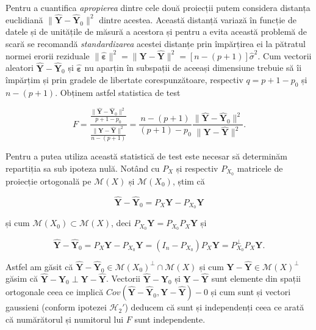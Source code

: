\documentclass[]{article}
\begin{document}
Pentru a cuantifica \emph{apropierea} dintre cele două proiecții putem
considera distanța euclidiană
\(\lVert\hat{\boldsymbol Y} - \hat{\boldsymbol Y}_0\rVert^2\) dintre
acestea. Această distanță variază în funcție de datele și de unitățile
de măsură a acestora și pentru a evita această problemă de scară se
recomandă \emph{standardizarea} acestei distanțe prin împărțirea ei la
pătratul normei erorii reziduale
\(\lVert\hat{\boldsymbol \varepsilon}\rVert^2 = \lVert\boldsymbol Y - \hat{\boldsymbol Y}\rVert^2 = [n - (p+1)]\hat{\sigma}^2\).
Cum vectorii aleatori \(\hat{\boldsymbol Y} - \hat{\boldsymbol Y}_0\) și
\(\hat{\boldsymbol \varepsilon}\) nu aparțin în subspații de aceeași
dimensiune trebuie să îi împărțim și prin gradele de libertate
corespunzătoare, respectiv \(q = p+1 - p_0\) și \(n - (p+1)\). Obținem
astfel statistica de test

\[
  F = \frac{\frac{\lVert\hat{\boldsymbol Y} - \hat{\boldsymbol Y}_0\rVert^2}{p+1-p_0}}{\frac{\lVert\boldsymbol Y - \hat{\boldsymbol Y}\rVert^2}{n - (p+1)}} = \frac{n - (p+1)}{(p+1) - p_0}\frac{\lVert\hat{\boldsymbol Y} - \hat{\boldsymbol Y}_0\rVert^2}{\lVert\boldsymbol Y - \hat{\boldsymbol Y}\rVert^2}.
\]

Pentru a putea utiliza această statistică de test este necesar să
determinăm repartiția sa sub ipoteza nulă. Notând cu \(P_X\) și
respectiv \(P_{X_0}\) matricele de proiecție ortogonală pe
\(\mathcal{M}(X)\) și \(\mathcal{M}(X_0)\), știm că

\[
  \hat{\boldsymbol Y} - \hat{\boldsymbol Y}_0 = P_X\boldsymbol Y - P_{X_0}\boldsymbol Y
\]

și cum \(\mathcal{M}(X_0)\subset \mathcal{M}(X)\), deci
\(P_{X_0}\boldsymbol Y = P_{X_0}P_{X}\boldsymbol Y\) și

\[
  \hat{\boldsymbol Y} - \hat{\boldsymbol Y}_0 = P_{X}\boldsymbol Y -  P_{X_0}\boldsymbol Y =  (I_n - P_{X_0})P_X\boldsymbol Y = P_{X_0}^\perp P_{X}\boldsymbol Y.
\]

Astfel am găsit că
\(\hat{\boldsymbol Y} - \hat{\boldsymbol Y}_0\in\mathcal{M}(X_0)^\perp\cap \mathcal{M}(X)\)
și cum \(\boldsymbol Y - \hat{\boldsymbol Y}\in\mathcal{M}(X)^\perp\)
găsim că
\(\hat{\boldsymbol Y} - \hat{\boldsymbol Y}_0 \perp \boldsymbol Y - \hat{\boldsymbol Y}\).
Vectorii \(\hat{\boldsymbol Y} - \hat{\boldsymbol Y}_0\) și
\(\boldsymbol Y - \hat{\boldsymbol Y}\) sunt elemente din spații
ortogonale ceea ce implică
\(Cov(\hat{\boldsymbol Y} - \hat{\boldsymbol Y}_0, \boldsymbol Y - \hat{\boldsymbol Y}) - 0\)
și cum sunt și vectori gaussieni (conform ipotezei \(\mathcal{H}_2'\))
deducem că sunt și independenți ceea ce arată că numărătorul și
numitorul lui \(F\) sunt independente.
\end{document}
